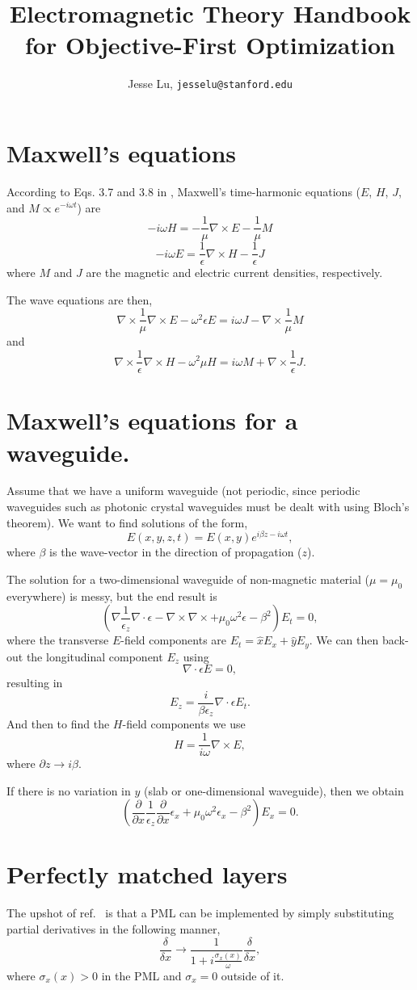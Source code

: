 \documentclass{article}
\title{Electromagnetic Theory Handbook for Objective-First Optimization}
\author{Jesse Lu, \texttt{jesselu@stanford.edu}}
\newcommand{\be}{\begin{equation}}
\newcommand{\ee}{\end{equation}}
\newcommand{\grad}{\nabla}
\newcommand{\dvg}{\nabla\cdot}
\newcommand{\curl}{\nabla\times}
\newcommand{\eps}{\epsilon}
\newcommand{\inv}{\frac{1}}
\newcommand{\del}{\partial}
\begin{document}
\maketitle
\tableofcontents

\section{Maxwell's equations}
According to Eqs. 3.7 and 3.8 in \cite{TH}, Maxwell's time-harmonic equations ($E$, $H$, $J$, and $M \propto e^{-i \omega t}$) are
\be -i \omega H = -\inv{\mu} \curl E - \inv{\mu} M \ee
\be -i \omega E = \inv{\eps} \curl H - \inv{\eps} J \ee
where $M$ and $J$ are the magnetic and electric current densities, respectively.

The wave equations are then,
\be \curl \inv{\mu} \curl E - \omega^2 \eps E = i \omega J - 
    \curl \inv{\mu} M \ee
    and
\be \curl \inv{\eps} \curl H - \omega^2 \mu H = i \omega M + 
    \curl \inv{\eps} J. \ee

\section{Maxwell's equations for a waveguide.}
Assume that we have a uniform waveguide (not periodic, since periodic waveguides such as photonic crystal waveguides must be dealt with using Bloch's theorem). We want to find solutions of the form,
\be E(x,y,z,t) = E(x,y)e^{i \beta z - i \omega t}, \ee
where $\beta$ is the wave-vector in the direction of propagation ($z$). 

The solution for a two-dimensional waveguide of non-magnetic material ($\mu = \mu_0$ everywhere) is messy\cite{WG}, but the end result is 
\be \left( \grad\inv{\eps_z}\dvg\eps - \curl\curl 
    + \mu_0\omega^2\eps - \beta^2 \right) E_t = 0, \ee
where the transverse $E$-field components are $E_t = \hat{x}E_x + \hat{y}E_y$.
We can then back-out the longitudinal component $E_z$ using
\be \dvg \eps E = 0, \ee
resulting in 
\be E_z = \frac{i}{\beta \eps_z} \dvg \eps E_t. \ee
And then to find the $H$-field components we use
\be H = \inv{i \omega} \curl E, \ee
where $\del z \rightarrow i \beta$.

If there is no variation in $y$ (slab or one-dimensional waveguide), 
then we obtain 
\be \left(\frac{\del}{\del x}\inv{\eps_z}\frac{\del}{\del x}\eps_x
    + \mu_0\omega^2\eps_x - \beta^2 \right) E_x = 0. \ee


\section{Perfectly matched layers}
The upshot of ref.~\cite{SJ} is that a PML can be implemented by simply substituting partial derivatives in the following manner,
\be \frac{\delta}{\delta x} \rightarrow
    \inv{1 + i\frac{\sigma_x(x)}{\omega}} \frac{\delta}{\delta x}, \ee
where $\sigma_x(x) > 0$ in the PML and $\sigma_x = 0$ outside of it.
\end{document}

